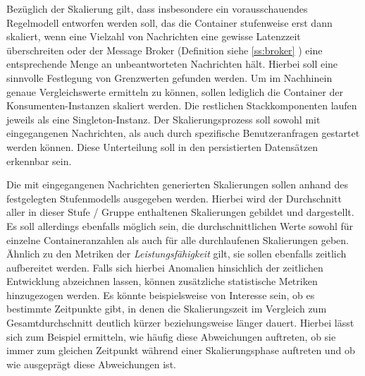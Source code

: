 Bezüglich der Skalierung gilt, dass insbesondere ein vorausschauendes Regelmodell entworfen werden soll, das die Container stufenweise erst dann skaliert, wenn eine Vielzahl von Nachrichten eine gewisse Latenzzeit überschreiten oder der Message Broker (Definition siehe \ref{ss:broker} ) eine entsprechende Menge an unbeantworteten Nachrichten hält. Hierbei soll eine sinnvolle Festlegung von Grenzwerten gefunden werden. Um im Nachhinein genaue Vergleichswerte ermitteln zu können, sollen lediglich die Container der Konsumenten-Instanzen skaliert werden. Die restlichen Stackkomponenten laufen jeweils als eine Singleton-Instanz. Der Skalierungsprozess soll sowohl mit eingegangenen Nachrichten, als auch durch spezifische Benutzeranfragen gestartet werden können. Diese Unterteilung soll in den persistierten Datensätzen erkennbar sein.

Die mit eingegangenen Nachrichten generierten Skalierungen sollen anhand des festgelegten Stufenmodells ausgegeben werden. Hierbei wird der Durchschnitt aller in dieser Stufe / Gruppe enthaltenen Skalierungen gebildet und dargestellt. Es soll allerdings ebenfalls möglich sein, die durchschnittlichen Werte sowohl für einzelne Containeranzahlen als auch für alle durchlaufenen Skalierungen geben. Ähnlich zu den Metriken der \emph{Leistungsfähigkeit} gilt, sie sollen ebenfalls zeitlich aufbereitet werden. Falls sich hierbei Anomalien hinsichlich der zeitlichen Entwicklung abzeichnen lassen, können zusätzliche statistische Metriken hinzugezogen werden. Es könnte beispielsweise von Interesse sein, ob es bestimmte Zeitpunkte gibt, in denen die Skalierungszeit im Vergleich zum Gesamtdurchschnitt deutlich kürzer beziehungsweise länger dauert. Hierbei lässt sich zum Beispiel ermitteln, wie häufig diese Abweichungen auftreten, ob sie immer zum gleichen Zeitpunkt während einer Skalierungsphase auftreten und ob wie ausgeprägt diese Abweichungen ist.

